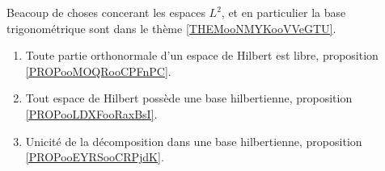 
Beacoup de choses concerant les espaces \( L^2\), et en particulier la base trigonométrique sont dans le thème \ref{THEMooNMYKooVVeGTU}.
\begin{enumerate}
	\item
	      Toute partie orthonormale d'un espace de Hilbert est libre, proposition \ref{PROPooMOQRooCPFnPC}.
	\item
	      Tout espace de Hilbert possède une base hilbertienne, proposition \ref{PROPooLDXFooRaxBsI}.
	\item
	      Unicité de la décomposition dans une base hilbertienne, proposition \ref{PROPooEYRSooCRPjdK}.
\end{enumerate}
